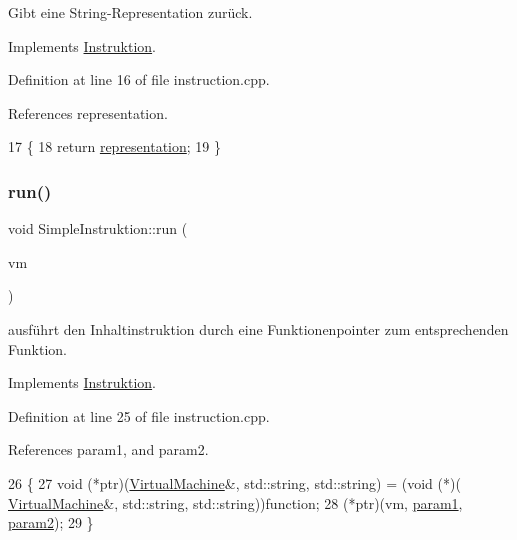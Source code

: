 Gibt eine String-\/\+Representation zurück. 

Implements \mbox{\hyperlink{class_instruktion_a267ff36e98ec889cceccb2f464c36bc6}{Instruktion}}.



Definition at line 16 of file instruction.\+cpp.



References representation.


\begin{DoxyCode}
17 \{
18     \textcolor{keywordflow}{return} \mbox{\hyperlink{class_simple_instruktion_a1e2b7a4f9d38ec973e030062570c4fe2}{representation}};
19 \}
\end{DoxyCode}
\mbox{\label{class_simple_instruktion_a5beecc39bbd465d001c41216ef4d46e7}} 
\subsubsection{\texorpdfstring{run()}{run()}}
{\footnotesize\ttfamily void Simple\+Instruktion\+::run (\begin{DoxyParamCaption}\item[{\mbox{\hyperlink{class_virtual_machine}{Virtual\+Machine}} \&}]{vm }\end{DoxyParamCaption})\hspace{0.3cm}{\ttfamily [virtual]}}

ausführt den Inhaltinstruktion durch eine Funktionenpointer zum entsprechenden Funktion. 

Implements \mbox{\hyperlink{class_instruktion_ad701f6b5537e5aa8c8c08b81a8946f63}{Instruktion}}.



Definition at line 25 of file instruction.\+cpp.



References param1, and param2.


\begin{DoxyCode}
26 \{
27     void (*ptr)(\mbox{\hyperlink{class_virtual_machine}{VirtualMachine}}&, std::string, std::string) = (\textcolor{keywordtype}{void} (*)(
      \mbox{\hyperlink{class_virtual_machine}{VirtualMachine}}&, std::string, std::string))\textcolor{keyword}{function};
28     (*ptr)(vm, \mbox{\hyperlink{class_simple_instruktion_a8a19958470817ee23384ac0c64fdc393}{param1}}, \mbox{\hyperlink{class_simple_instruktion_a9682f053735fffdf061ec43a989482e2}{param2}});
29 \}
\end{DoxyCode}


